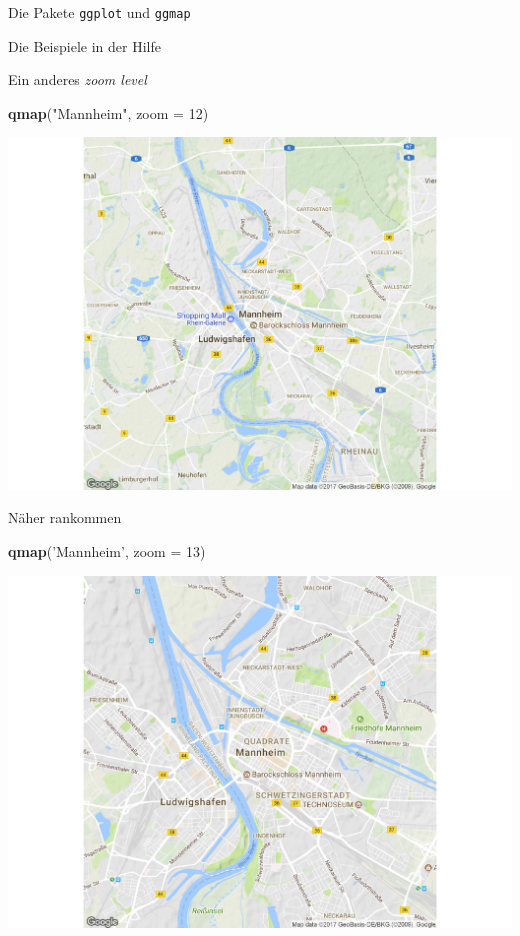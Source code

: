 \documentclass[ignorenonframetext,]{beamer}
\newenvironment{Shaded}{}{}
\newcommand{\KeywordTok}[1]{\textcolor[rgb]{0.00,0.44,0.13}{\textbf{{#1}}}}
\newcommand{\DataTypeTok}[1]{\textcolor[rgb]{0.56,0.13,0.00}{{#1}}}
\newcommand{\DecValTok}[1]{\textcolor[rgb]{0.25,0.63,0.44}{{#1}}}
\newcommand{\StringTok}[1]{\textcolor[rgb]{0.25,0.44,0.63}{{#1}}}
\newcommand{\NormalTok}[1]{{#1}}
\begin{document}
\begin{frame}[fragile]{Die Pakete \texttt{ggplot} und \texttt{ggmap}}
\begin{block}{Die Beispiele in der Hilfe}
\end{block}

\begin{block}{Ein anderes \emph{zoom level}}

\begin{Shaded}
\begin{Highlighting}[]
\KeywordTok{qmap}\NormalTok{(}\StringTok{"Mannheim"}\NormalTok{, }\DataTypeTok{zoom =} \DecValTok{12}\NormalTok{)}
\end{Highlighting}
\end{Shaded}

\includegraphics{R_intern_files/figure-beamer/unnamed-chunk-259-1.pdf}

\end{block}

\begin{block}{Näher rankommen}

\begin{Shaded}
\begin{Highlighting}[]
\KeywordTok{qmap}\NormalTok{(}\StringTok{'Mannheim'}\NormalTok{, }\DataTypeTok{zoom =} \DecValTok{13}\NormalTok{)}
\end{Highlighting}
\end{Shaded}

\includegraphics{R_intern_files/figure-beamer/unnamed-chunk-260-1.pdf}


\end{block}
\end{frame}
\end{document}
